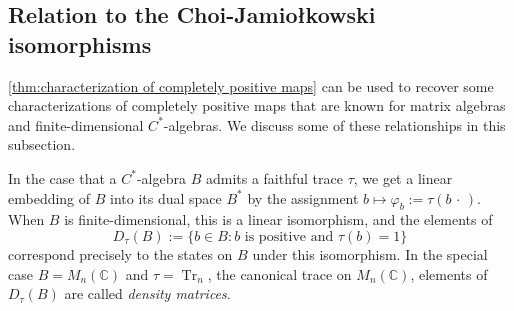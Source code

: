 \documentclass[11pt, a4paper, oneside, final, reqno]{amsart}
\newcommand{\bbC}{\mathbb{C}}
\newcommand{\Tr}{\operatorname{Tr}}
\theoremstyle{definition}
\theoremstyle{plain}
\theoremstyle{remark}
\numberwithin{equation}{section}
\begin{document}
\subsection{Relation to the Choi-Jamio\l{}kowski isomorphisms}\label{sec:relation-to-choi-jamiolkowski-isos}

\cref{thm:characterization of completely positive maps} can be used to recover some characterizations of completely positive maps that are known for matrix algebras and finite-dimensional $C^*$-algebras. We discuss some of these relationships
in this subsection.

In the case that a $C^*$-algebra $B$ admits a faithful trace $\tau$, we get a linear embedding of $B$ into its dual space $B^*$ by the assignment $b \mapsto \varphi_b := \tau(b \, \cdot \,)$. When $B$ is finite-dimensional, this is  a linear isomorphism, and the elements of
\begin{equation*}
    D_\tau(B) := \{ b \in B : b \text{ is positive and } \tau(b) = 1\}
\end{equation*}
correspond precisely to the states on $B$ under this isomorphism. In the special case $B = M_n(\bbC)$ and $\tau = \Tr_n$, the canonical trace on $M_n(\bbC)$, elements of $D_\tau(B)$ are called \emph{density matrices}.
\end{document}
